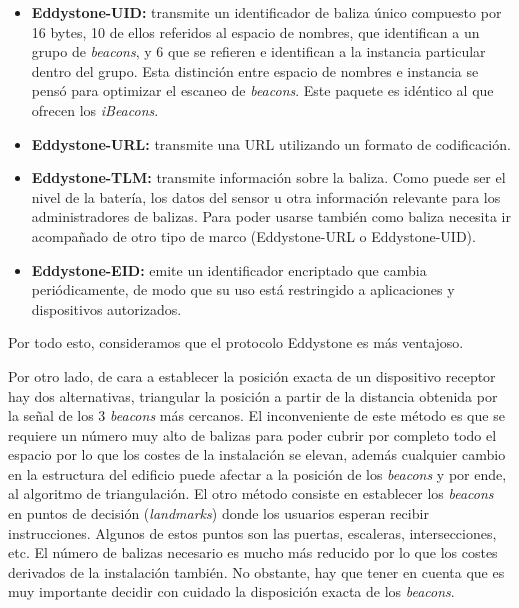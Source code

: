 \begin{itemize}
	\item \textbf{Eddystone-UID:} transmite un identificador de baliza único compuesto por 16 bytes, 10 de ellos referidos al espacio de nombres, que identifican a un grupo de \textit{beacons}, y 6 que se refieren e identifican a la instancia particular dentro del grupo. Esta distinción entre espacio de nombres e instancia se pensó para optimizar el escaneo de \textit{beacons}. Este paquete es idéntico al que ofrecen los \textit{iBeacons}.
	\item \textbf{Eddystone-URL:} transmite una URL utilizando un formato de codificación.
	\item \textbf{Eddystone-TLM:} transmite información sobre la baliza. Como puede ser el nivel de la batería, los datos del sensor u otra información relevante para los administradores de balizas. Para poder usarse también como baliza necesita ir acompañado de otro tipo de marco (Eddystone-URL o Eddystone-UID).
	\item \textbf{Eddystone-EID:} emite un identificador encriptado que cambia periódicamente, de modo que su uso está restringido a aplicaciones y dispositivos autorizados.
\end{itemize}

Por todo esto, consideramos que el protocolo Eddystone es más ventajoso. 

Por otro lado, de cara a establecer la posición exacta de un dispositivo receptor hay dos alternativas, triangular la posición a partir de la distancia obtenida por la señal de los 3 \textit{beacons} más cercanos. El inconveniente de este método es que se requiere un número muy alto de balizas para poder cubrir por completo todo el espacio por lo que los costes de la instalación se elevan, además cualquier cambio en la estructura del edificio puede afectar a la posición de los \textit{beacons} y por ende, al algoritmo de triangulación. El otro método consiste en establecer los \textit{beacons} en puntos de decisión (\textit{landmarks}) donde los usuarios esperan recibir instrucciones. Algunos de estos puntos son las puertas, escaleras, intersecciones, etc. El número de balizas necesario es mucho más reducido por lo que los costes derivados de la instalación también. No obstante, hay que tener en cuenta que es muy importante decidir con cuidado la disposición exacta de los \textit{beacons}. 

